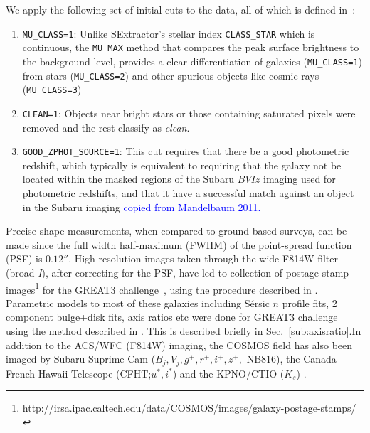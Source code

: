\documentclass[twocolumn,useAMS,usenatbib]{mn2e}
\newcommand{\rachel}[1]{{\textcolor{red}{#1}}}
\newcommand{\arun}[1]{{\textcolor{blue}{#1}}}
\newcommand{\sersicn}{S\'{e}rsic $n$ }
\begin{document}
We apply the following set of initial cuts to the data, all of which is defined in~\cite{COSMOS_Alexie}:
\begin{enumerate}
 \item \texttt{MU\_CLASS=1}: Unlike SExtractor's stellar index \texttt{CLASS\_STAR} which is continuous, the \texttt{MU\_MAX} method that compares the peak surface brightness to the background level,
 provides a clear differentiation of galaxies (\texttt{MU\_CLASS=1}) from stars (\texttt{MU\_CLASS=2}) and other spurious objects like cosmic rays (\texttt{MU\_CLASS=3})
 
 \item \texttt{CLEAN=1}: Objects near bright stars or those containing saturated pixels were removed and the rest classify as \emph{clean}.
 
 \item \texttt{GOOD\_ZPHOT\_SOURCE=1}: This cut requires that there be a good photometric redshift, which typically is equivalent to requiring that the galaxy not be located within
                                       the masked regions of the Subaru $BVIz$ imaging used for photometric redshifts, and that it have a successful match against an object in the Subaru imaging
                                       \arun{copied from Mandelbaum 2011.}
\end{enumerate}

Precise shape measurements, when compared to ground-based surveys, can be made since the full width half-maximum (FWHM) of the point-spread function (PSF)
is $0.12''$. High resolution images taken through the wide F814W filter (broad \emph{I}), after correcting for the PSF, have led to collection of postage stamp images\footnote{http://irsa.ipac.caltech.edu/data/COSMOS/images/galaxy-postage-stamps/} for the GREAT3 challenge~\citep{great3}, using the procedure described in \cite{SHERA}.
Parametric models to most of these galaxies including \sersicn profile fits, 
2 component bulge+disk fits, axis ratios etc were done for GREAT3 challenge~\citep{great3} using the method described in \cite{Claire_Fits}. This is described briefly in Sec.~\ref{sub:axisratio}.In addition to the ACS/WFC (F814W) imaging, the COSMOS field has also been imaged by Subaru Suprime-Cam ($B_j, V_j, g^+,r^+,i^+,z^+,$ NB816), the
Canada-French Hawaii Telescope (CFHT;$u^*,i^*$) and the KPNO/CTIO ($K_s$) .
	      
\end{document}
